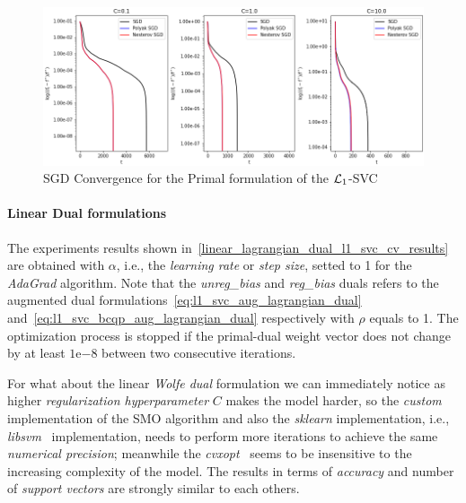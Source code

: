 \begin{figure}[H]
	\centering
	\includegraphics[scale=0.55]{img/l1_svc_loss_history}
	\caption{SGD Convergence for the Primal formulation of the $\protect \mathcal{L}_1$-SVC}
	\label{fig:l1_svc_history}
\end{figure}

\paragraph{Linear Dual formulations}

The experiments results shown in~\ref{linear_lagrangian_dual_l1_svc_cv_results} are obtained with $\alpha$, i.e., the \emph{learning rate} or \emph{step size}, setted to 1 for the \emph{AdaGrad} algorithm. Note that the \emph{unreg\_bias} and \emph{reg\_bias} duals refers to the augmented dual formulations~\eqref{eq:l1_svc_aug_lagrangian_dual} and~\eqref{eq:l1_svc_bcqp_aug_lagrangian_dual} respectively with $\rho$ equals to 1. The optimization process is stopped if the primal-dual weight vector does not change by at least $1\mathrm{e}{-8}$  between two consecutive iterations.



For what about the linear \emph{Wolfe dual} formulation we can immediately notice as higher \emph{regularization hyperparameter} $C$ makes the model harder, so the \emph{custom} implementation of the SMO algorithm and also the \emph{sklearn} implementation, i.e., \emph{libsvm}~\cite{chang2011libsvm} implementation, needs to perform more iterations to achieve the same \emph{numerical precision}; meanwhile the \emph{cvxopt}~\cite{vandenberghe2010cvxopt} seems to be insensitive to the increasing complexity of the model. The results in terms of \emph{accuracy} and number of \emph{support vectors} are strongly similar to each others.




